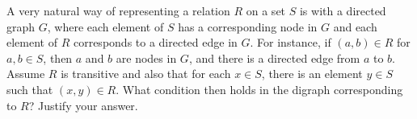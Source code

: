 A very natural way of representing a relation $R$ on a set $S$ is with a
directed graph $G$, where each element of $S$ has a corresponding node in $G$
and each element of $R$ corresponds to a directed edge in $G$.  For instance,
if $(a,b)\in  R$ for $a,b \in  S$, then $a$ and $b$ are nodes in $G$, and there
is a directed edge from $a$ to $b$.  Assume $R$ is transitive and also that
for each $x\in  S$, there is an element $y\in  S$ such that $(x,y)\in  R$.
What condition then holds in the digraph corresponding to $R$?  Justify your
answer.
